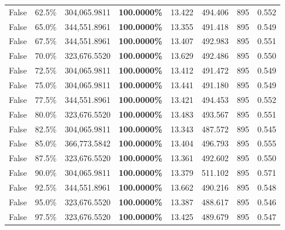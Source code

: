 \begin{table}[H]
\begin{tabular}{lllrllll}
\cline{1-8}
False & 62.5\% & 304,065.9811 & \bfseries \color{red} 100.0000\% & 13.422 & 494.406 & 895 & 0.552 \\
\cline{1-8}
False & 65.0\% & 344,551.8961 & \bfseries \color{red} 100.0000\% & 13.355 & 491.418 & 895 & 0.549 \\
\cline{1-8}
False & 67.5\% & 344,551.8961 & \bfseries \color{red} 100.0000\% & 13.407 & 492.983 & 895 & 0.551 \\
\cline{1-8}
False & 70.0\% & 323,676.5520 & \bfseries \color{red} 100.0000\% & 13.629 & 492.486 & 895 & 0.550 \\
\cline{1-8}
False & 72.5\% & 304,065.9811 & \bfseries \color{red} 100.0000\% & 13.412 & 491.472 & 895 & 0.549 \\
\cline{1-8}
False & 75.0\% & 304,065.9811 & \bfseries \color{red} 100.0000\% & 13.441 & 491.180 & 895 & 0.549 \\
\cline{1-8}
False & 77.5\% & 344,551.8961 & \bfseries \color{red} 100.0000\% & 13.421 & 494.453 & 895 & 0.552 \\
\cline{1-8}
False & 80.0\% & 323,676.5520 & \bfseries \color{red} 100.0000\% & 13.483 & 493.567 & 895 & 0.551 \\
\cline{1-8}
False & 82.5\% & 304,065.9811 & \bfseries \color{red} 100.0000\% & 13.343 & 487.572 & 895 & 0.545 \\
\cline{1-8}
False & 85.0\% & 366,773.5842 & \bfseries \color{red} 100.0000\% & 13.404 & 496.793 & 895 & 0.555 \\
\cline{1-8}
False & 87.5\% & 323,676.5520 & \bfseries \color{red} 100.0000\% & 13.361 & 492.602 & 895 & 0.550 \\
\cline{1-8}
False & 90.0\% & 304,065.9811 & \bfseries \color{red} 100.0000\% & 13.379 & 511.102 & 895 & 0.571 \\
\cline{1-8}
False & 92.5\% & 344,551.8961 & \bfseries \color{red} 100.0000\% & 13.662 & 490.216 & 895 & 0.548 \\
\cline{1-8}
False & 95.0\% & 323,676.5520 & \bfseries \color{red} 100.0000\% & 13.387 & 488.617 & 895 & 0.546 \\
\cline{1-8}
False & 97.5\% & 323,676.5520 & \bfseries \color{red} 100.0000\% & 13.425 & 489.679 & 895 & 0.547 \\
\cline{1-8}
\bottomrule
\end{tabular}
\end{table}
